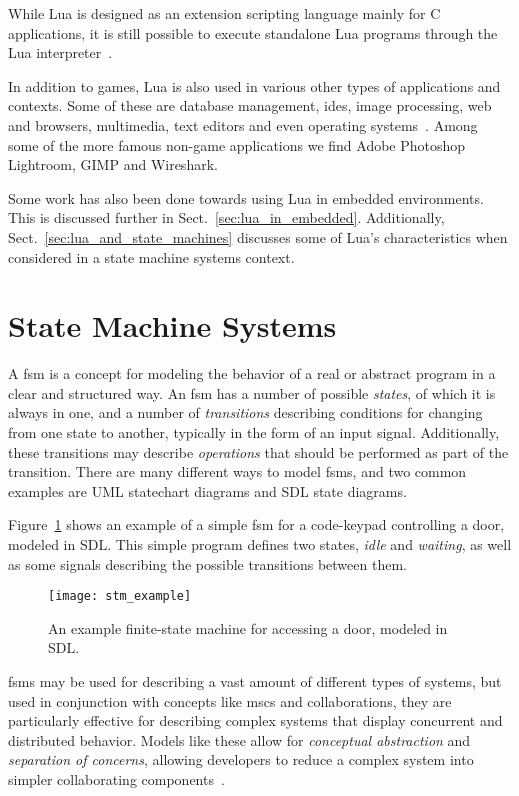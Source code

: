 \noindent
While Lua is designed as an extension scripting language mainly for C applications, it is still possible to execute standalone Lua programs through the Lua interpreter~\cite[ch. 7]{manual:lua_reference_manual}.

\noindent
In addition to games, Lua is also used in various other types of applications and contexts. Some of these are database management, \glspl{ide}, image processing, web and browsers, multimedia, text editors and even operating systems~\cite{website:where_lua_is_used}. Among some of the more famous non-game applications we find Adobe Photoshop Lightroom, GIMP and Wireshark.

\noindent
Some work has also been done towards using Lua in embedded environments. This is discussed further in Sect.~\ref{sec:lua_in_embedded}. Additionally, Sect.~\ref{sec:lua_and_state_machines} discusses some of Lua's characteristics when considered in a state machine systems context.

\section{State Machine Systems}
\label{sec:state_machine_system}
A \gls{fsm} is a concept for modeling the behavior of a real or abstract program in a clear and structured way. An \gls{fsm} has a number of possible \emph{states}, of which it is always in one, and a number of \emph{transitions} describing conditions for changing from one state to another, typically in the form of an input signal. Additionally, these transitions may describe \emph{operations} that should be performed as part of the transition. There are many different ways to model \glspl{fsm}, and two common examples are UML statechart diagrams and SDL state diagrams.

\noindent
Figure~\ref{fig:fsm_example} shows an example of a simple \gls{fsm} for a code-keypad controlling a door, modeled in SDL. This simple program defines two states, \emph{idle} and \emph{waiting}, as well as some signals describing the possible transitions between them.

\begin{figure}[htp]
	\centering
	\texttt{[image: stm\_example]}
	\caption[SDL finite-state machine example]{An example finite-state machine for accessing a door, modeled in SDL.}
	\label{fig:fsm_example}
\end{figure}

\noindent
\glspl{fsm} may be used for describing a vast amount of different types of systems, but used in conjunction with concepts like \glspl{msc} and collaborations, they are particularly effective for describing complex systems that display concurrent and distributed behavior. Models like these allow for \emph{conceptual abstraction} and \emph{separation of concerns}, allowing developers to reduce a complex system into simpler collaborating components~\cite{article:itut_methodologies}.

